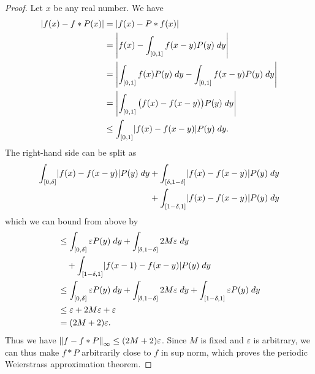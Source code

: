 \begin{proof}
    Let \(x\) be any real number.
    We have
    \begin{align*}
        \abs*{f(x) - f * P(x)} & = \abs*{f(x) - P * f(x)}                                                   \\
                               & = \abs*{f(x) - \int_{[0, 1]} f(x - y) P(y) \; dy}                          \\
                               & = \abs*{\int_{[0, 1]} f(x) P(y) \; dy - \int_{[0, 1]} f(x - y) P(y) \; dy} \\
                               & = \abs*{\int_{[0, 1]} \big(f(x) - f(x - y)\big) P(y) \; dy}                \\
                               & \leq \int_{[0, 1]} \abs*{f(x) - f(x - y)} P(y) \; dy.
    \end{align*}
    The right-hand side can be split as
    \begin{align*}
        \int_{[0, \delta]} \abs*{f(x) - f(x - y)} P(y) \; dy & + \int_{[\delta, 1 - \delta]} \abs*{f(x) - f(x - y)} P(y) \; dy \\
                                                             & + \int_{[1 - \delta, 1]} \abs*{f(x) - f(x - y)} P(y) \; dy
    \end{align*}
    which we can bound from above by
    \begin{align*}
         & \leq \int_{[0, \delta]} \varepsilon P(y) \; dy + \int_{[\delta, 1 - \delta]} 2 M \varepsilon \; dy                                                 \\
         & \quad + \int_{[1 - \delta, 1]} \abs*{f(x - 1) - f(x - y)} P(y) \; dy                                                                               \\
         & \leq \int_{[0, \delta]} \varepsilon P(y) \; dy + \int_{[\delta, 1 - \delta]} 2 M \varepsilon \; dy + \int_{[1 - \delta, 1]} \varepsilon P(y) \; dy \\
         & \leq \varepsilon + 2 M \varepsilon + \varepsilon                                                                                                   \\
         & = (2M + 2) \varepsilon.
    \end{align*}
    Thus we have \(\norm*{f - f * P}_{\infty} \leq (2M + 2) \varepsilon\).
    Since \(M\) is fixed and \(\varepsilon\) is arbitrary, we can thus make \(f * P\) arbitrarily close to \(f\) in sup norm, which proves the periodic Weierstrass approximation theorem.
\end{proof}

